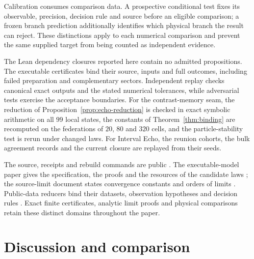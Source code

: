 \documentclass[11pt]{article}
\theoremstyle{definition}
\theoremstyle{remark}
\begin{document}
Calibration consumes comparison data. A prospective conditional test fixes its
observable, precision, decision rule and source before an eligible comparison;
a frozen branch prediction additionally identifies which physical branch the
result can reject. These distinctions apply to each numerical comparison and
prevent the same supplied target from being counted as independent evidence.

The Lean dependency closures reported here contain no admitted propositions.
The executable certificates bind their source, inputs and full outcomes,
including failed preparation and complementary sectors. Independent replay
checks canonical exact outputs and the stated numerical tolerances, while
adversarial tests exercise the acceptance boundaries. For the
contrast-memory seam, the reduction of
Proposition~\ref{prop:echo-reduction} is checked in exact symbolic
arithmetic on all $99$ local states, the constants of
Theorem~\ref{thm:binding} are recomputed on the federations of $20$, $80$
and $320$ cells, and the particle-stability test is rerun under changed
laws. For Interval Echo, the reunion cohorts, the bulk agreement records
and the current closure are replayed from their seeds.

The source, receipts and rebuild commands are public
\cite{ophrepo,ophsim,ophmodel}. The executable-model paper gives the
specification, the proofs and the resources of the candidate laws
\cite{ophspine}; the source-limit document states convergence
constants and orders of limits \cite{ophcontinuum}. Public-data reducers bind
their datasets, observation hypotheses and decision rules
\cite{ophbell,ophpublicdata}. Exact finite certificates, analytic limit proofs
and physical comparisons retain these distinct domains throughout the paper.


\section{Discussion and comparison}
\label{sec:discussion}
\end{document}
